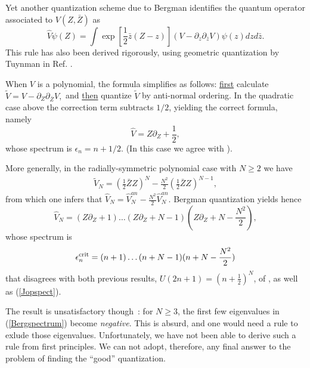 \documentclass[a4paper,11pt]{article}
\newcommand{\half}{{\scriptstyle{\frac{1}{2}}}}
\def\p{{\partial}}
\begin{document}
Yet another quantization scheme
due to Bergman  \cite{Bergman} identifies
the quantum operator associated to $V(Z,\bar{Z})$ as
\begin{equation}
     \widehat{V}\psi(Z)=
     \int\exp\left[\half\bar{z}(Z-z)\right]
     \left(V-\p_{z}\p_{\bar{z}}V\right)\psi(z)dzd\bar{z}.
     \label{Bergmankernel}
\end{equation}
This rule has also been derived rigorously, using geometric
quantization by Tuynman in Ref. \cite{Bergman}.

When $V$ is a polynomial, the formula simplifies
as follows:  \underline{first} calculate
$
\widetilde{V}=V-\p_{Z}\p_{\bar{Z}}V,
$
  and \underline{then} quantize $\widetilde{V}$ by anti-normal ordering.
In the quadratic case above the correction term
subtracts $1/2$, yielding the correct formula, namely
\begin{equation}
     \widehat{V}=Z\p_{Z}+\frac{1}{2},
         \label{goodosc}
\end{equation}
whose spectrum is $\epsilon_{n}=n+1/2$.
(In this case we agree with \cite{GAMB, BNS}).

More generally, in the radially-symmetric polynomial case with $N\geq2$
we have
\begin{eqnarray*}
\widetilde{V}_{N}=\left(\half{\bar{Z}Z}\right)^N
-\frac{N^2}{2}\left(\half{\bar{Z}Z}\right)^{N-1},
\end{eqnarray*}
from which one infers that
$
\widehat{V}_{N}=\widehat{V}^{an}_{N}
-\frac{N^2}{2} \widehat{V}^{an}_{N}.
$
Bergman quantization yields hence
\begin{equation}
     \widehat{V}_{N}=
     (Z\p_{Z}+1)\dots(Z\p_{Z}+N-1)(Z\p_{Z}+N-\frac{N^2}{2}),
     \label{BergVop}
\end{equation}
whose spectrum is
\begin{equation}
     \epsilon_{n}^{\rm crit}=
     (n+1)\dots(n+N-1)(n+N-\frac{N^2}{2})
     \label{Bergspectrum}
\end{equation}
that disagrees with both previous results,
$U(2n+1)=(n+\half)^N$,
of \cite{BNS}, as well as  (\ref{Jopspect}).

The result is unsatisfactory though~: for $N\geq3$, the
first few eigenvalues in
(\ref{Bergspectrum}) become {\it negative}. This is
absurd, and one would need a rule to exlude those eigenvalues.
Unfortunately, we have not been able to derive such a rule
from first principles. We can not adopt, therefore, any
final answer to the problem of finding the ``good'' quantization.
\end{document}
